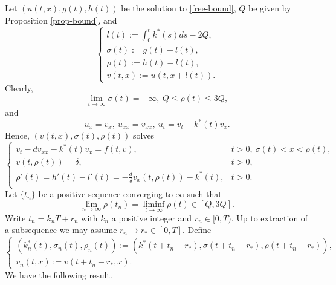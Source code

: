 \documentclass[11pt]{amsart}
\numberwithin{equation}{section}
\begin{document}
Let $(u(t,x), g(t), h(t))$ be the solution to \eqref{free-bound}, $Q$ be given by Proposition \ref{prop-bound},  and
\begin{equation*}\begin{cases}
  l(t):=\int_0^tk^*(s)ds-2Q, \\
  \sigma(t):=g(t)-l(t),\\
   \rho(t):=h(t)-l(t),\\  v(t,x):=u(t,x+l(t)).
   \end{cases}
\end{equation*}
Clearly, 
\begin{equation}\label{eq-c3c}
\lim_{t\to\infty}\sigma(t)=-\infty,\    Q\leq \rho(t)\leq 3Q,
\end{equation}
and
\begin{equation*}
u_x=v_x, ~u_{xx}=v_{xx},~  u_t=v_t-k^*(t)v_x.
\end{equation*}
Hence, $(v(t,x),\sigma(t),\rho(t))$ solves
\begin{equation*}
  \begin{cases}
    v_t-dv_{xx}-k^*(t)v_x=f(t,v), &t>0,\ \sigma(t)<x<\rho(t),\\
   v(t,\rho(t))=\delta, &t>0,\\
    \rho'(t)=h'(t)-l'(t)=-\frac{d}{\delta}v_x(t,\rho(t))-k^*(t),&t>0.\\
  \end{cases}
\end{equation*}
Let $\{t_n\}$ be a positive sequence converging to $\infty$ such that   
\begin{equation*}
  \lim_{n\to\infty}\rho(t_n)=\liminf_{t\to\infty}\rho(t)\in [Q, 3Q].
\end{equation*}
Write $t_n=k_nT+r_n$ with $k_n$ a positive integer and $r_n\in [0, T)$. Up to extraction of a subsequence  we may assume $r_n\to r_*\in[0,T]$.
Define
\begin{equation*}\begin{cases}
  (k_n^*(t),\sigma_n(t),\rho_n(t)):=(k^*(t+t_n-r_*),\sigma(t+t_n-r_*),\rho(t+t_n-r_*)), \\
  v_n(t,x):=v(t+t_n-r_*,x).
  \end{cases}
\end{equation*}
We have  the following result.
\end{document}
